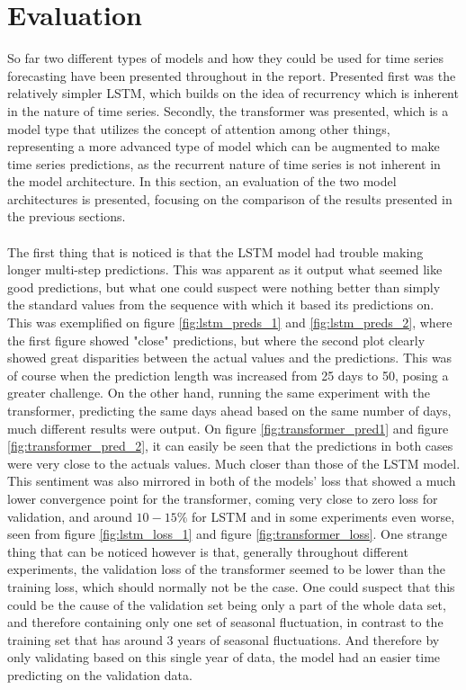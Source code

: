\documentclass[main.tex]{subfiles}
\begin{document}
\section{Evaluation}

So far two different types of models and how they could be used for time series forecasting have been presented throughout in the report. Presented first was the relatively simpler LSTM, which builds on the idea of recurrency which is inherent in the nature of time series. Secondly, the transformer was presented, which is a model type that utilizes the concept of attention among other things, representing a more advanced type of model which can be augmented to make time series predictions, as the recurrent nature of time series is not inherent in the model architecture. In this section, an evaluation of the two model architectures is presented, focusing on the comparison of the results presented in the previous sections.\\
\\
The first thing that is noticed is that the LSTM model had trouble making longer multi-step predictions. This was apparent as it output what seemed like good predictions, but what one could suspect were nothing better than simply the standard values from the sequence with which it based its predictions on. This was exemplified on figure \ref{fig:lstm_preds_1} and \ref{fig:lstm_preds_2}, where the first figure showed "close" predictions, but where the second plot clearly showed great disparities between the actual values and the predictions. This was of course when the prediction length was increased from 25 days to 50, posing a greater challenge. On the other hand, running the same experiment with the transformer, predicting the same days ahead based on the same number of days, much different results were output. On figure \ref{fig:transformer_pred1} and figure \ref{fig:transformer_pred_2}, it can easily be seen that the predictions in both cases were very close to the actuals values. Much closer than those of the LSTM model.\\
This sentiment was also mirrored in both of the models' loss that showed a much lower convergence point for the transformer, coming very close to zero loss for validation, and around $10-15\%$ for LSTM and in some experiments even worse, seen from figure \ref{fig:lstm_loss_1} and figure \ref{fig:transformer_loss}. One strange thing that can be noticed however is that, generally throughout different experiments, the validation loss of the transformer seemed to be lower than the training loss, which should normally not be the case. One could suspect that this could be the cause of the validation set being only a part of the whole data set, and therefore containing only one set of seasonal fluctuation, in contrast to the training set that has around 3 years of seasonal fluctuations. And therefore by only validating based on this single year of data, the model had an easier time predicting on the validation data.\\
\end{document}

